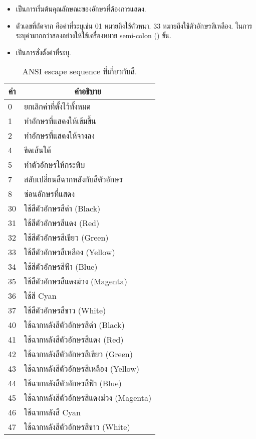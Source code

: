 \begin{thwbr}
\begin{itemize}
\item \cmd{[} เป็นการเริ่มต้นคุณลักษณะของอักษรที่ต้องการแสดง.
\item ตัวเลขที่ถัดจาก \cmd{[} คือค่าที่ระบุเช่น 01 หมายถึงใช้ตัวหนา. 33 หมายถึงใช้ตัวอักษรสีเหลือง. ในการระบุค่ามากกว่าสองอย่างให้ใช้เครื่องหมาย semi-colon (\cmd{;}) ขั้น.
\item {} เป็นการสั่งตั้งค่าที่ระบุ.
\end{itemize}
%

\begin{table}[!htb]
\center
\caption{ANSI escape sequence ที่เกี่ยวกับสี. \cite{ansicolor}}\label{tab:ansiterminal}
\bigskip
\begin{tabular}{l|l}
\hline
\multicolumn{1}{c|}{ค่า} & \multicolumn{1}{|c}{คำอธิบาย}\\
\hline
0 &	ยกเลิกค่าที่ตั้งไว้ทั้งหมด\\
1 &	ทำอักษรที่แสดงให้เข้มขึ้น\\
2 &	ทำอักษรที่แสดงให้จางลง\\
4 &	ขีดเส้นใต้\\
5 &	ทำตัวอักษรให้กระพิบ\\
7 &	สลับเปลี่ยนสีฉากหลังกับสีตัวอักษร\\
8 &	ซ่อนอักษรที่แสดง\\
30 &	ใช้สีตัวอักษรสีดำ (Black)\\	      
31 &	ใช้สีตัวอักษรสีแดง (Red)\\	      
32 &	ใช้สีตัวอักษรสีเขียว (Green)\\      
33 &	ใช้สีตัวอักษรสีเหลือง (Yellow)\\    
34 &	ใช้สีตัวอักษรสีฟ้า (Blue)\\	      
35 &	ใช้สีตัวอักษรสีแดงม่วง (Magenta)\\  
36 &	ใช้สี Cyan\\		      
37 &	ใช้สีตัวอักษรสีขาว (White)\\       
40 &	ใช้ฉากหลังสีตัวอักษรสีดำ (Black)\\	   
41 &	ใช้ฉากหลังสีตัวอักษรสีแดง (Red)\\	   
42 &	ใช้ฉากหลังสีตัวอักษรสีเขียว (Green)\\     
43 &	ใช้ฉากหลังสีตัวอักษรสีเหลือง (Yellow)\\   
44 &	ใช้ฉากหลังสีตัวอักษรสีฟ้า (Blue)\\	   
45 &	ใช้ฉากหลังสีตัวอักษรสีแดงม่วง (Magenta)\\ 
46 &	ใช้ฉากหลังสี Cyan\\		   
47 &	ใช้ฉากหลังสีตัวอักษรสีขาว (White)\\      
\hline
\end{tabular}
\end{table}



\end{thwbr}
